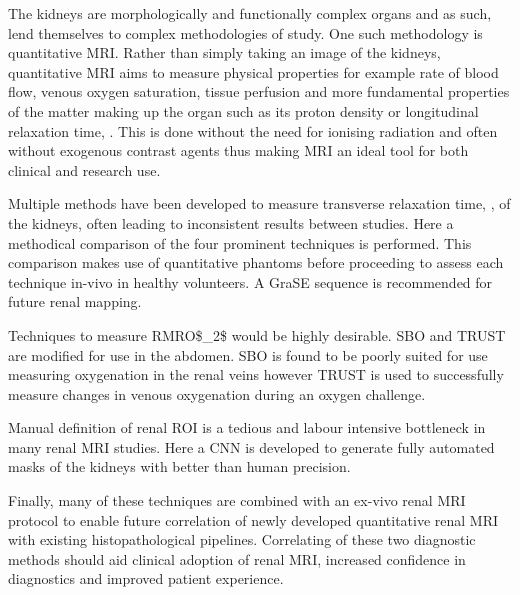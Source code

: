 The kidneys are morphologically and functionally complex organs and as such, lend themselves to complex methodologies of study. One such methodology is quantitative \ac{MRI}. Rather than simply taking an image of the kidneys, quantitative \ac{MRI} aims to measure physical properties for example rate of blood flow, venous oxygen saturation, tissue perfusion and more fundamental properties of the matter making up the organ such as its proton density or longitudinal relaxation time, \tone. This is done without the need for ionising radiation and often without exogenous contrast agents thus making \ac{MRI} an ideal tool for both clinical and research use.

Multiple methods have been developed to measure transverse relaxation time, \ttwo, of the kidneys, often leading to inconsistent results between studies. Here a methodical comparison of the four prominent techniques is performed. This comparison makes use of quantitative phantoms before proceeding to assess each technique in-vivo in healthy volunteers. A \ac{GraSE} sequence is recommended for future renal \ttwo mapping.

Techniques to measure \ac{RMRO$_2$} would be highly desirable. \ac{SBO} and \ac{TRUST} are modified for use in the abdomen. \ac{SBO} is found to be poorly suited for use measuring oxygenation in the renal veins however \ac{TRUST} is used to successfully measure changes in venous oxygenation during an oxygen challenge.

Manual definition of renal \ac{ROI} is a tedious and labour intensive bottleneck in many renal \ac{MRI} studies. Here a \ac{CNN} is developed to generate fully automated masks of the kidneys with better than human precision.

Finally, many of these techniques are combined with an ex-vivo renal \ac{MRI} protocol to enable future correlation of newly developed quantitative renal \ac{MRI} with existing histopathological pipelines. Correlating of these two diagnostic methods should aid clinical adoption of renal \ac{MRI}, increased confidence in diagnostics and improved patient experience.
